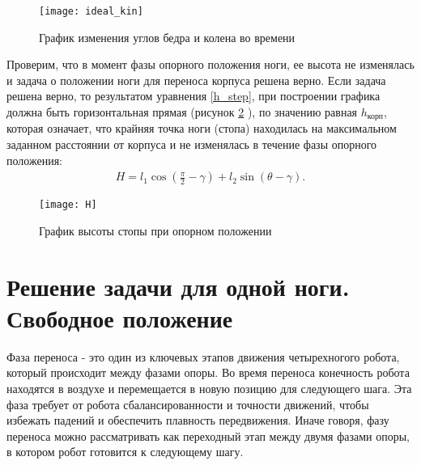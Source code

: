 \begin{figure}[h!]
	\begin{center}
		\texttt{[image: ideal\_kin]}
		\caption{График изменения углов бедра и колена во времени}
		\label{ideal_kin}
	\end{center}
\end{figure}

\newpage 
Проверим, что в момент фазы опорного положения ноги, ее высота не изменялась и задача о положении ноги для переноса корпуса решена верно. Если задача решена верно, то результатом уравнения \ref{h_step}, при построении графика должна быть горизонтальная прямая (рисунок \ref{H} ), по значению равная $h_{\text{корп}}$, которая означает, что крайняя точка ноги (стопа) находилась на максимальном заданном расстоянии от корпуса и не изменялась в течение фазы опорного положения:
\begin{equation}
	\begin{array}{l}
		H = l_{1}\cos({\frac{\pi}{2}-\gamma}) + l_{2}\sin({\theta-\gamma}).
	\end{array}
	\label{h_step}
\end{equation}
\newline
\begin{figure}[h!]
	\begin{center}
		\texttt{[image: H]}
		\caption{График высоты стопы при опорном положении}
		\label{H}
	\end{center}
\end{figure}
\newpage
\section{Решение задачи для одной ноги. Свободное положение}\label{C3_3}
Фаза переноса - это один из ключевых этапов движения четырехногого робота, который происходит между фазами опоры. Во время переноса конечность робота находятся в воздухе и перемещается в новую позицию для следующего шага. Эта фаза требует от робота сбалансированности и точности движений, чтобы избежать падений и обеспечить плавность передвижения. Иначе говоря, фазу переноса можно рассматривать как переходный этап между двумя фазами опоры, в котором робот готовится к следующему шагу.

